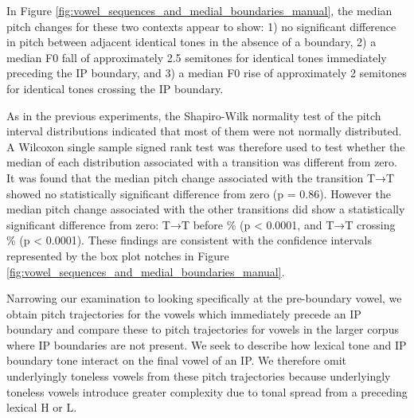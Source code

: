 \documentclass[
  11pt,
  b5paper,
]{article}
\begin{document}
In Figure \ref{fig:vowel_sequences_and_medial_boundaries_manual}, the
median pitch changes for these two contexts appear to show: 1) no
significant difference in pitch between adjacent identical tones in the
absence of a boundary, 2) a median F0 fall of approximately 2.5
semitones for identical tones immediately preceding the IP boundary, and
3) a median F0 rise of approximately 2 semitones for identical tones
crossing the IP boundary.

As in the previous experiments, the Shapiro-Wilk normality test of the
pitch interval distributions indicated that most of them were not
normally distributed. A Wilcoxon single sample signed rank test was
therefore used to test whether the median of each distribution
associated with a transition was different from zero. It was found that
the median pitch change associated with the transition T→T showed no
statistically significant difference from zero (p = 0.86). However the
median pitch change associated with the other transitions did show a
statistically significant difference from zero: T→T before \% (p
\textless{} 0.0001, and T→T crossing \% (p \textless{} 0.0001). These
findings are consistent with the confidence intervals represented by the
box plot notches in Figure
\ref{fig:vowel_sequences_and_medial_boundaries_manual}.

Narrowing our examination to looking specifically at the pre-boundary
vowel, we obtain pitch trajectories for the vowels which immediately
precede an IP boundary and compare these to pitch trajectories for
vowels in the larger corpus where IP boundaries are not present. We seek
to describe how lexical tone and IP boundary tone interact on the final
vowel of an IP. We therefore omit underlyingly toneless vowels from
these pitch trajectories because underlyingly toneless vowels introduce
greater complexity due to tonal spread from a preceding lexical H or L.
\end{document}

